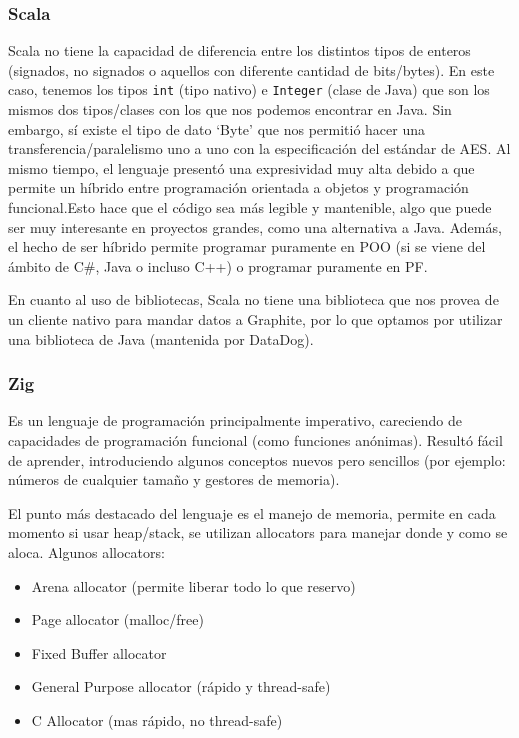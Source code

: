\documentclass[11pt]{article}
\let\Oldsubsubsection\subsubsection
\renewcommand{\subsubsection}{\FloatBarrier\Oldsubsubsection}
\begin{document}
\subsubsection{Scala}

Scala no tiene la capacidad de diferencia entre los distintos tipos de enteros (signados, no signados o aquellos con diferente cantidad de bits/bytes). En este caso, tenemos los tipos \texttt{int} (tipo nativo) e \texttt{Integer} (clase de Java) que son los mismos dos tipos/clases con los que nos podemos encontrar en Java. Sin embargo, sí existe el tipo de dato ‘Byte’ que nos permitió hacer una transferencia/paralelismo uno a uno con la especificación del estándar de AES. Al mismo tiempo, el lenguaje presentó una expresividad muy alta debido a que permite un híbrido entre programación orientada a objetos y programación funcional.Esto hace que el código sea más legible y mantenible, algo que puede ser muy interesante en proyectos grandes, como una alternativa a Java. Además, el hecho de ser híbrido permite programar puramente en POO (si se viene del ámbito de C\#, Java o incluso C++) o programar puramente en PF.

En cuanto al uso de bibliotecas, Scala no tiene una biblioteca que nos provea de un cliente nativo para mandar datos a Graphite, por lo que optamos por utilizar una biblioteca de Java (mantenida por DataDog).

\subsubsection{Zig}

Es un lenguaje de programación principalmente imperativo, careciendo de capacidades de programación funcional (como funciones anónimas). Resultó fácil de aprender, introduciendo algunos conceptos nuevos pero sencillos (por ejemplo: números de cualquier tamaño y gestores de memoria).

El punto más destacado del lenguaje es el manejo de memoria, permite en cada momento si usar heap/stack, se utilizan allocators para manejar donde y como se aloca. Algunos allocators:
\begin{itemize}
    \item Arena allocator (permite liberar todo lo que reservo)
    \item Page allocator (malloc/free)
    \item Fixed Buffer allocator
    \item General Purpose allocator (rápido y thread-safe)
    \item C Allocator (mas rápido, no thread-safe) 
\end{itemize}
\end{document}
